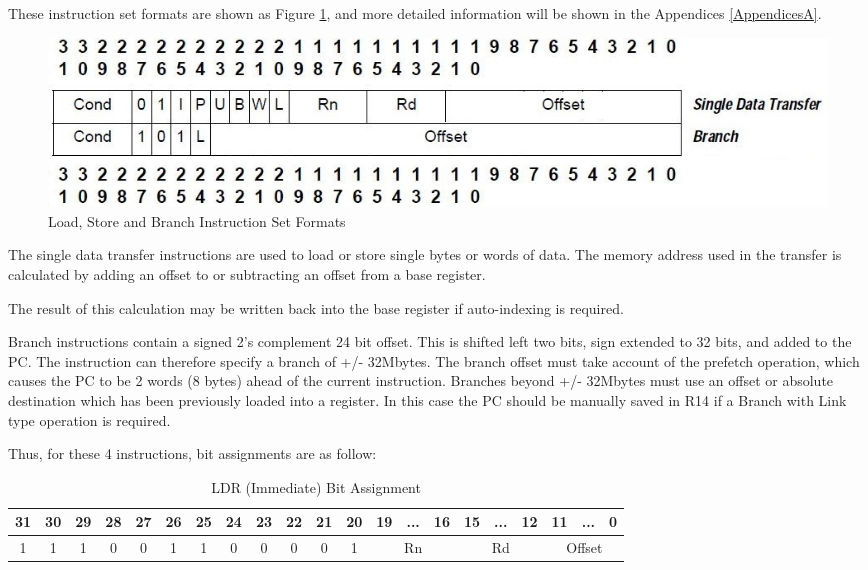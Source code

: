 These instruction set formats are shown as Figure \ref{fig:AISFIP}, and more detailed information will be shown in the Appendices \ref{AppendicesA}.

\begin{figure}[htp]
    \centering
    \includegraphics[width=1\textwidth]{picture/ARM instruction set formats in project.jpg}
    \caption{Load, Store and Branch Instruction Set Formats}     
    \label{fig:AISFIP}
\end{figure}

The single data transfer instructions are used to load or store single bytes or words of
data. The memory address used in the transfer is calculated by adding an offset to or
subtracting an offset from a base register.

The result of this calculation may be written back into the base register if auto-indexing
is required.

Branch instructions contain a signed 2’s complement 24 bit offset. This is shifted left
two bits, sign extended to 32 bits, and added to the PC. The instruction can therefore
specify a branch of +/- 32Mbytes. The branch offset must take account of the prefetch
operation, which causes the PC to be 2 words (8 bytes) ahead of the current instruction.
Branches beyond +/- 32Mbytes must use an offset or absolute destination which has
been previously loaded into a register. In this case the PC should be manually saved in
R14 if a Branch with Link type operation is required.

Thus, for these 4 instructions, bit assignments are as follow:\\
\begin{table}[h!]
    \centering
    \caption{LDR (Immediate) Bit Assignment}
    \label{tab:LDRBA}
    \begin{tabular}{|cccc|cccccccc|ccc|ccc|ccc|}
    \hline
    31 & 30 & 29 & 28 & 27 & 26                     & 25                     & 24                     & 23                     & 22                     & 21                     & 20 & 19     & ...    & 16    & 15     & ...    & 12    & 11      & ...      & 0      \\ \hline
    1  & 1  & 1  & 0  & 0  & \multicolumn{1}{c|}{1} & \multicolumn{1}{c|}{1} & \multicolumn{1}{c|}{0} & \multicolumn{1}{c|}{0} & \multicolumn{1}{c|}{0} & \multicolumn{1}{c|}{0} & 1  & \multicolumn{3}{c|}{Rn} & \multicolumn{3}{c|}{Rd} & \multicolumn{3}{c|}{Offset} \\ \hline
    \end{tabular}
\end{table}

